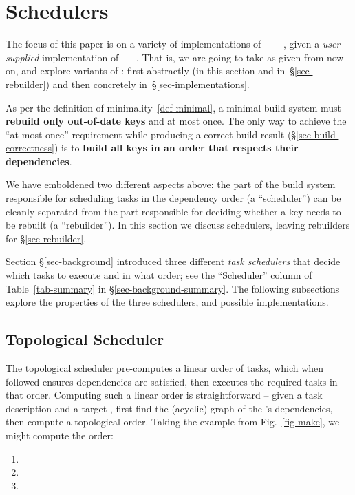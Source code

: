 \section{Schedulers}\label{sec-scheduler}

The focus of this paper is on a variety of implementations of
~~~~, given a \emph{user-supplied}
implementation of ~~~. That is, we are going to take
 as given from now on, and explore variants of : first
abstractly (in this section and in~\S\ref{sec-rebuilder}) and then concretely
in~\S\ref{sec-implementations}.

As per the definition of minimality~\ref{def-minimal}, a minimal build
system must \textbf{rebuild only out-of-date keys} and at most once. The only
way to achieve the ``at most once'' requirement while producing a correct build
result (\S\ref{sec-build-correctness}) is to \textbf{build all keys in an
order that respects their dependencies}.

We have emboldened two different aspects above: the part of the build system
responsible for scheduling tasks in the dependency order (a ``scheduler'') can
be cleanly separated from the part responsible for deciding whether a key needs
to be rebuilt (a ``rebuilder''). In this section we discuss schedulers, leaving
rebuilders for \S\ref{sec-rebuilder}.

Section \S\ref{sec-background} introduced three different \emph{task schedulers}
that decide which tasks to execute and in what order; see the ``Scheduler''
column of Table~\ref{tab-summary} in \S\ref{sec-background-summary}. The
following subsections explore the properties of the three schedulers, and
possible implementations.

\subsection{Topological Scheduler}\label{sec-topological}

The topological scheduler pre-computes a linear order of tasks, which when
followed ensures dependencies are satisfied, then executes the required tasks in
that order. Computing such a linear order is straightforward -- given a task
description and a target , first find the (acyclic) graph of the
's dependencies, then compute a topological order. Taking the \Make
example from Fig.~\ref{fig-make}, we might compute the order:

\begin{enumerate}
\item {}
\item {}
\item {}
\end{enumerate}

